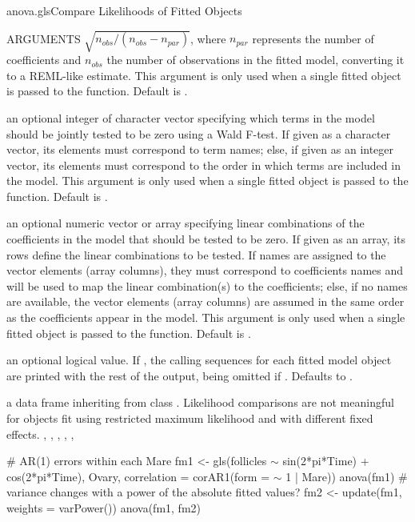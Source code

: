 \documentclass[pdftex]{article} \usepackage{url,graphicx}
\renewcommand{\Twiddle}{\mbox{\(\sim\)}}
\begin{document}
\begin{Helpfile}{anova.gls}{Compare Likelihoods of Fitted Objects}
\begin{Argument}{ARGUMENTS}
  $\sqrt{n_{obs}/(n_{obs} - n_{par})}$, where $n_{par}$ represents the
  number of coefficients and $n_{obs}$ the number of observations in
  the fitted model, converting it to a REML-like estimate. This
  argument is only used when a single fitted object is passed to the
  function. Default is .
\item[\Co{terms:}]
an optional integer of character vector specifying which
terms in the model should be jointly tested to be zero using a Wald
F-test. If given as a character vector, its elements must correspond
to term names; else, if given as an integer vector, its elements must
correspond to the order in which terms are included in the
model. This argument is only used when a single fitted object is
passed to the function. Default is .
\item[\Co{L:}]
an optional numeric vector or array specifying linear
combinations of the coefficients in the model that should be tested
to be zero. If given as an array, its rows define the linear
combinations to be tested. If names are assigned to the vector
elements (array columns), they must correspond to coefficients
names and will be used to map the linear combination(s) to the
coefficients; else, if no names are available, the vector elements
(array columns) are assumed in the same order as the coefficients
appear in the model. This argument is only used when a single fitted
object is passed to the function. Default is .
\item[\Co{verbose:}]
an optional logical value. If , the calling
sequences for each fitted model object are printed with the rest of
the output, being omitted if . Defaults to
.
\end{Argument}
a data frame inheriting from class .
 Likelihood comparisons are not meaningful for objects fit using 
restricted maximum likelihood and with different fixed effects.
, , ,
, , 
\need 15pt
\vspace{-16pt}
\begin{Example}
# AR(1) errors within each Mare
fm1 <- gls(follicles {\Twiddle} sin(2*pi*Time) + cos(2*pi*Time), Ovary,
           correlation = corAR1(form = {\Twiddle} 1 | Mare))
anova(fm1)
# variance changes with a power of the absolute fitted values?
fm2 <- update(fm1, weights = varPower())
anova(fm1, fm2)
\end{Example}
\end{Helpfile}
\end{document}
